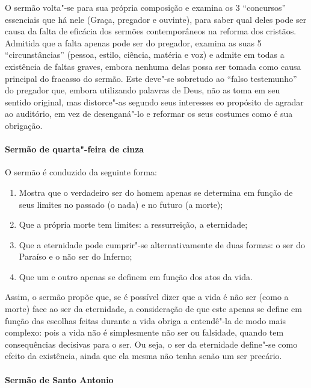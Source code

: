 O sermão volta"-se para sua própria composição e examina os 3 ``concursos'' essenciais que
há nele (Graça, pregador e ouvinte), para saber qual deles pode ser causa da falta de eficácia dos sermões contemporâneos na reforma dos cristãos. Admitida que a falta apenas pode
ser do pregador, examina as suas 5 ``circunstâncias'' (pessoa, estilo, ciência, matéria e voz) e admite em todas a existência de faltas graves, embora nenhuma delas possa ser tomada
como causa principal do fracasso do sermão. Este deve"-se sobretudo ao ``falso testemunho''
do pregador que, embora utilizando palavras de Deus, não as toma em seu sentido original,
mas distorce"-as segundo seus interesses eo propósito de agradar ao auditório, em vez de
desenganá"-lo e reformar os seus costumes como é sua obrigação.

\paragraph{Sermão de quarta"-feira de cinza}

O sermão é conduzido da seguinte forma:
\begin{enumerate}
\item Mostra que o verdadeiro ser do homem apenas se determina em função de seus limites
no passado (o nada) e no futuro (a morte);

\item Que a própria morte tem limites: a ressurreição, a eternidade;

\item Que a eternidade pode cumprir"-se alternativamente de duas formas: o ser do Paraíso e
o não ser do Inferno;

\item Que um e outro apenas se definem em função dos atos da vida.
\end{enumerate}

Assim, o sermão propõe que, se é possível dizer que a vida é não ser (como a morte) face ao
ser da eternidade, a consideração de que este apenas se define em função das escolhas
feitas durante a vida obriga a entendê"-la de modo mais complexo: pois a vida não é
simplesmente não ser ou falsidade, quando tem consequências decisivas para o ser. Ou
seja, o ser da eternidade define"-se como efeito da existência, ainda que ela mesma não
tenha senão um ser precário.

\paragraph{Sermão de Santo Antonio}


